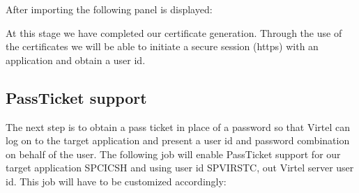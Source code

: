 \documentclass[letterpaper,10pt,english]{sphinxmanual}
\begin{document}


After importing the following panel is displayed:



At this stage we have completed our certificate generation. Through the use of the certificates we will be able to initiate a secure session (https) with an application and obtain a user id.


\subsection{PassTicket support}
\label{\detokenize{TN202002:passticket-support}}
The next step is to obtain a pass ticket in place of a password so that Virtel can log on to the target application and present a user id and password combination on behalf of the user. The following job will enable PassTicket support for our target application SPCICSH and using user id SPVIRSTC, out Virtel server user id. This job will have to be customized
accordingly:
\end{document}
